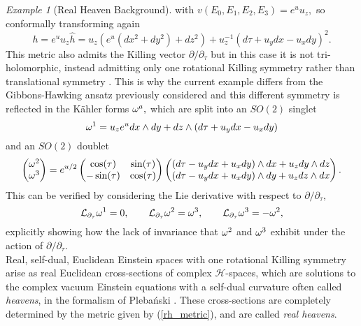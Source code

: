\documentclass[a4paper,12pt, onecolumn, notitlepage]{article}
\theoremstyle{definition}
\theoremstyle{remark}
\newtheorem{ex}[thm]{Example}
\newcommand{\w}{\omega}
\newcommand{\K}{K\"ahler }
\begin{document}
\begin{ex}[Real Heaven Background]
	with $v(E_{0},E_{1},E_{2},E_{3})=e^{u}u_{z},$ so conformally transforming again
	\begin{equation}
	\label{rh_metric}
	h=e^{u}u_{z}\hat{h}=u_{z}(e^{u}(dx^{2}+dy^{2}) + dz^{2}) + u_{z}^{-1}(d\tau + u_{y}dx - u_{x}dy)^{2}.
	\end{equation}
	This metric also admits the Killing vector $\partial/\partial_{\tau}$ but in this case it is not tri-holomorphic, instead admitting only one rotational Killing symmetry rather than translational symmetry \cite{park_1990}. This is why the current example differs from the Gibbons-Hawking ansatz previously considered and this different symmetry is reflected in the \K forms $\w\indices{^a},$ which are split into an $SO(2)$ singlet
	\begin{equation}
	\label{su_k1}
		\w\indices{^1} = u_{z}e^{u}dx\wedge dy + dz \wedge (d\tau + u_{y}dx - u_{x}dy)
	\end{equation}
	and an $SO(2)$ doublet \cite{bakas_1995}
	\begin{equation}
	\label{su_k23}
		\begin{pmatrix}
		\w\indices{^2}\\
		\w\indices{^3}
		\end{pmatrix}
		=
		e^{u/2}
		\begin{pmatrix}
		\cos(\tau) & \sin(\tau) \\
		-\sin(\tau) & \cos(\tau)
		\end{pmatrix}
		\begin{pmatrix}
		(d\tau - u_{y}dx+u_{x}dy)\wedge dx + u_{z}dy\wedge dz\\
		(d\tau - u_{y}dx+u_{x}dy) \wedge dy + u_{z}dz\wedge dx
		\end{pmatrix}.
	\end{equation}
	This can be verified by considering the Lie derivative with respect to $\partial/\partial_{\tau},$
	\begin{equation*}
		\mathcal{L}_{\partial_{\tau}}\w\indices{^1}=0,\qquad \mathcal{L}_{\partial_{\tau}}\w\indices{^2}=\w\indices{^3},\qquad
		\mathcal{L}_{\partial_{\tau}}\w\indices{^3}= -\w\indices{^2},
	\end{equation*}
	explicitly showing how the lack of invariance that $\w\indices{^2}$ and $\w\indices{^3}$ exhibit under the action of $\partial/\partial_{\tau}.$\\
	Real, self-dual, Euclidean Einstein spaces with one rotational Killing symmetry arise as real Euclidean cross-sections of complex $\mathcal{H}$-spaces, which are solutions to the complex vacuum Einstein equations with a self-dual curvature often called \emph{heavens}, in the formalism of Pleba\'nski \cite{plebanski_1975,park_1990}. These cross-sections are completely determined by the metric given by (\ref{rh_metric}), and are called \emph{real heavens}.\\
\end{ex}
\end{document}
